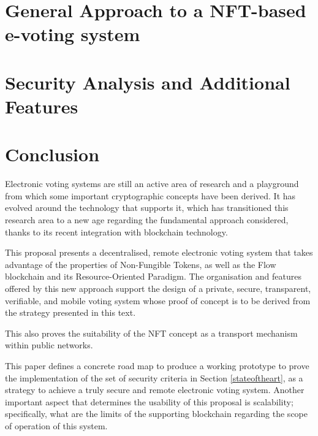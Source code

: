 \documentclass[10pt]{article}
\begin{document}
    \section{General Approach to a NFT-based e-voting system}
        \label{general_approach}
        
    
    \section{Security Analysis and Additional Features}
        \label{features_and_security}
        
    
        
    \section {Conclusion}
    \label{conclusion}
    Electronic voting systems are still an active area of research and a playground from which some important cryptographic concepts have been derived. It has evolved around the technology that supports it, which has transitioned this research area to a new age regarding the fundamental approach considered, thanks to its recent integration with blockchain technology.
    \par
    This proposal presents a decentralised, remote electronic voting system that takes advantage of the properties of Non-Fungible Tokens, as well as the Flow blockchain and its Resource-Oriented Paradigm. The organisation and features offered by this new approach support the design of a private, secure, transparent, verifiable, and mobile voting system whose proof of concept is to be derived from the strategy presented in this text.
    \par
    This also proves the suitability of the NFT concept as a transport mechanism within public networks.
    \par
    This paper defines a concrete road map to produce a working prototype to prove the implementation of the set of security criteria in Section \ref{stateoftheart}, as a strategy to achieve a truly secure and remote electronic voting system. Another important aspect that determines the usability of this proposal is scalability; specifically, what are the limits of the supporting blockchain regarding the scope of operation of this system.

\printbibliography
\end{document}
